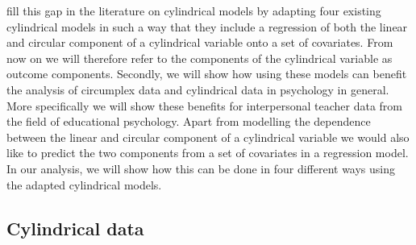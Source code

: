\documentclass[man]{apa6}
\theoremstyle{definition}
\theoremstyle{definition}
\theoremstyle{definition}
\theoremstyle{remark}
\begin{document}
fill this gap in the literature on cylindrical models by adapting four
existing cylindrical models in such a way that they include a regression
of both the linear and circular component of a cylindrical variable onto
a set of covariates. From now on we will therefore refer to the
components of the cylindrical variable as outcome components. Secondly,
we will show how using these models can benefit the analysis of
circumplex data and cylindrical data in psychology in general. More
specifically we will show these benefits for interpersonal teacher data
from the field of educational psychology. Apart from modelling the
dependence between the linear and circular component of a cylindrical
variable we would also like to predict the two components from a set of
covariates in a regression model. In our analysis, we will show how this
can be done in four different ways using the adapted cylindrical models.

\subsection{Cylindrical data}
\end{document}
